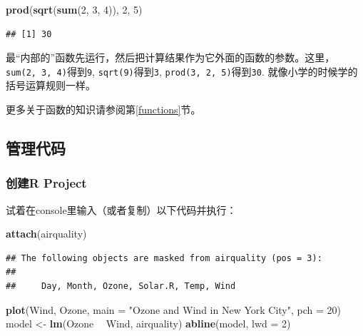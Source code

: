 \documentclass[]{book}
\newenvironment{Shaded}{\begin{snugshade}}{\end{snugshade}}
\newcommand{\DataTypeTok}[1]{\textcolor[rgb]{0.13,0.29,0.53}{#1}}
\newcommand{\DecValTok}[1]{\textcolor[rgb]{0.00,0.00,0.81}{#1}}
\newcommand{\KeywordTok}[1]{\textcolor[rgb]{0.13,0.29,0.53}{\textbf{#1}}}
\newcommand{\NormalTok}[1]{#1}
\newcommand{\OperatorTok}[1]{\textcolor[rgb]{0.81,0.36,0.00}{\textbf{#1}}}
\newcommand{\StringTok}[1]{\textcolor[rgb]{0.31,0.60,0.02}{#1}}
\begin{document}
\begin{Shaded}
\begin{Highlighting}[]
\KeywordTok{prod}\NormalTok{(}\KeywordTok{sqrt}\NormalTok{(}\KeywordTok{sum}\NormalTok{(}\DecValTok{2}\NormalTok{, }\DecValTok{3}\NormalTok{, }\DecValTok{4}\NormalTok{)), }\DecValTok{2}\NormalTok{, }\DecValTok{5}\NormalTok{)}
\end{Highlighting}
\end{Shaded}

\begin{verbatim}
## [1] 30
\end{verbatim}

最``内部的''函数先运行，然后把计算结果作为它外面的函数的参数。这里，\texttt{sum(2,\ 3,\ 4)}得到\texttt{9}, \texttt{sqrt(9)}得到\texttt{3}, \texttt{prod(3,\ 2,\ 5)}得到\texttt{30}. 就像小学的时候学的括号运算规则一样。

更多关于函数的知识请参阅第\ref{functions}节。

\hypertarget{code-management}{%
\subsection{管理代码}\label{code-management}}

\hypertarget{project-create}{%
\subsubsection{创建R Project}\label{project-create}}

试着在console里输入（或者复制）以下代码并执行：

\begin{Shaded}
\begin{Highlighting}[]
\KeywordTok{attach}\NormalTok{(airquality)}
\end{Highlighting}
\end{Shaded}

\begin{verbatim}
## The following objects are masked from airquality (pos = 3):
## 
##     Day, Month, Ozone, Solar.R, Temp, Wind
\end{verbatim}

\begin{Shaded}
\begin{Highlighting}[]
\KeywordTok{plot}\NormalTok{(Wind, Ozone, }\DataTypeTok{main =} \StringTok{"Ozone and Wind in New York City"}\NormalTok{, }\DataTypeTok{pch =} \DecValTok{20}\NormalTok{)}
\NormalTok{model <-}\StringTok{ }\KeywordTok{lm}\NormalTok{(Ozone }\OperatorTok{~}\StringTok{ }\NormalTok{Wind, airquality)}
\KeywordTok{abline}\NormalTok{(model, }\DataTypeTok{lwd =} \DecValTok{2}\NormalTok{)}
\end{Highlighting}
\end{Shaded}
\end{document}
